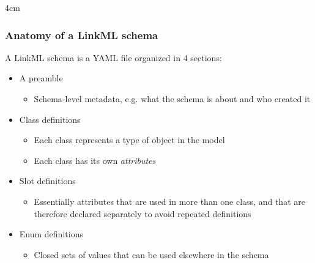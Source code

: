 \begin{frame}
\begin{overlayarea}{\textwidth}{4cm}
  \end{overlayarea}

\end{frame}

\begin{frame}
  \frametitle{Anatomy of a LinkML schema}

  A LinkML schema is a YAML file organized in 4 sections:
  \begin{itemize}
    \item A preamble
      \begin{itemize}
        \item Schema-level metadata, e.g. what the schema is about and who
              created it
      \end{itemize}
    \item Class definitions
      \begin{itemize}
        \item Each class represents a type of object in the model
        \item Each class has its own \emph{attributes}
      \end{itemize}
    \item Slot definitions
      \begin{itemize}
        \item Essentially attributes that are used in more than one class,
              and that are therefore declared separately to avoid repeated
              definitions
      \end{itemize}
    \item Enum definitions
      \begin{itemize}
        \item Closed sets of values that can be used elsewhere in the schema
      \end{itemize}
  \end{itemize}
\end{frame}

